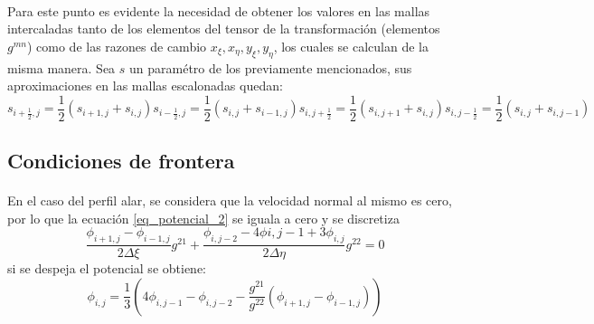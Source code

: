 \documentclass[letterpaper, openright, 12pt]{book}
\begin{document}
    \paragraph*{}
        Para este punto es evidente la necesidad de obtener los valores en las
        mallas intercaladas tanto de los elementos del tensor de la
        transformación (elementos $g^{mn}$) como de las razones de cambio
        $x_\xi, x_\eta, y_\xi, y_\eta$, los cuales se calculan de la misma
        manera. Sea $s$ un paramétro de los previamente mencionados, sus
        aproximaciones en las mallas escalonadas quedan:
        \begin{subequations}
            \begin{equation}
                s_{i + \frac{1}{2}, j} = \frac{1}{2} \left( s_{i+1, j}
                        + s_{i, j}\right)
            \end{equation}
            \begin{equation}
                s_{i - \frac{1}{2}, j} = \frac{1}{2} \left( s_{i, j}
                        + s_{i-1, j}\right)
            \end{equation}
            \begin{equation}
                s_{i, j + \frac{1}{2}} = \frac{1}{2} \left( s_{i, j+1}
                        + s_{i, j}\right)
            \end{equation}
            \begin{equation}
                s_{i, j - \frac{1}{2}} = \frac{1}{2} \left( s_{i, j}
                        + s_{i, j-1}\right)
            \end{equation}
        \end{subequations}

    \subsection{Condiciones de frontera}
    \paragraph*{}
        En el caso del perfil alar, se considera que la velocidad normal al
        mismo es cero, por lo que la ecuación \ref{eq_potencial_2} se iguala a
        cero y se discretiza
        \begin{equation}
            \frac{\phi_{i+1, j} - \phi_{i-1, j}}{2 \Delta \xi} g^{21}
            + \frac{\phi_{i, j-2} - 4 \phi{i, j-1} + 3 \phi_{i, j}}{2\Delta \eta}
                    g^{22} = 0
        \end{equation}
        si se despeja el potencial se obtiene:
        \begin{equation}
            \phi_{i, j} = \frac{1}{3} \left(4 \phi_{i, j-1} - \phi_{i, j-2}
                - \frac{g^{21}}{g^{22}} \left( \phi_{i+1, j} - \phi_{i-1, j}
                    \right) \right)
        \end{equation}
\end{document}
